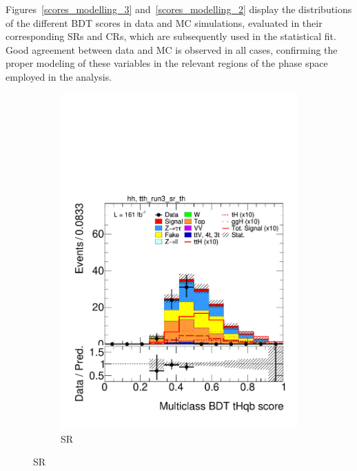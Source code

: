 Figures~\ref{scores_modelling_3} and~\ref{scores_modelling_2} display the distributions of the different BDT scores in data and MC simulations, evaluated in their corresponding SRs and CRs, which are subsequently used in the statistical fit. Good agreement between data and MC is observed in all cases, confirming the proper modeling of these variables in the relevant regions of the phase space employed in the analysis.

\begin{figure}[htbp]
  \centering
  \begin{subfigure}[b]{0.49\textwidth}
    \centering
    \includegraphics[width=\textwidth]{images/plots_modelling_run2_run3_variables/run_3_tth/plot_tth_th_multiclass_th_hh_tth_run3_sr_th_22_23_24.pdf}
    \caption{\thqb SR}


\end{subfigure}
\end{figure}
